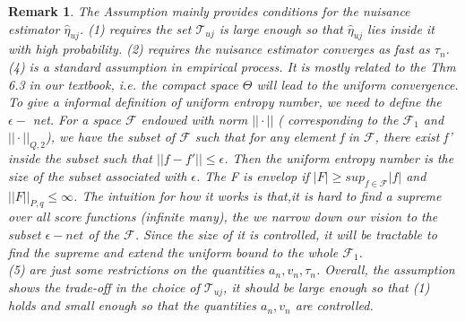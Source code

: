 \documentclass{article}
\newtheorem{remark}[theorem]{Remark}
\begin{document}
\begin{remark}
    The Assumption mainly provides conditions for the nuisance estimator $\hat{\eta}_{uj}$. (1) requires the set $\mathcal{T}_{uj}$ is large enough so that $\hat{\eta}_{uj}$ lies inside it with high probability. (2) requires the nuisance estimator converges as fast as $\tau_n$.\\
    (4) is a standard assumption in empirical process. It is mostly related to the Thm 6.3 in our textbook, i.e. the compact space $\Theta$ will lead to the uniform convergence. To give a informal definition of uniform entropy number, we need to define the $\epsilon-$ net. For a space $\mathcal{F}$ endowed with norm $||\cdot||$ ( corresponding to the $\mathcal{F}_1$ and $||\cdot||_{Q,2}$), we have the subset of $\mathcal{F} $ such that for any element f in $\mathcal{F}$, there exist f' inside the subset such that $||f-f'||\leq \epsilon$. Then the uniform entropy number is the size of the subset associated with $\epsilon$. The F is envelop if $|F|\geq sup_{f\in\mathcal{F}}|f|$ and $||F||_{P,q}\leq \infty$. The intuition for how it works is that,it is hard to find a supreme over all score functions (infinite many), the we narrow down our vision to the subset $\epsilon- net$ of the $\mathcal{F}$. Since the size of it is controlled, it will be tractable to find the supreme and extend the uniform bound to the whole $\mathcal{F}_1$.\\
    (5) are just some restrictions on the quantities $a_n, v_n, \tau_n$. Overall, the assumption shows the trade-off in the choice of $\mathcal{T}_{uj}$, it should be large enough so that (1) holds and small enough so that the quantities $a_n,v_n$ are controlled. 
\end{remark}
\end{document}
